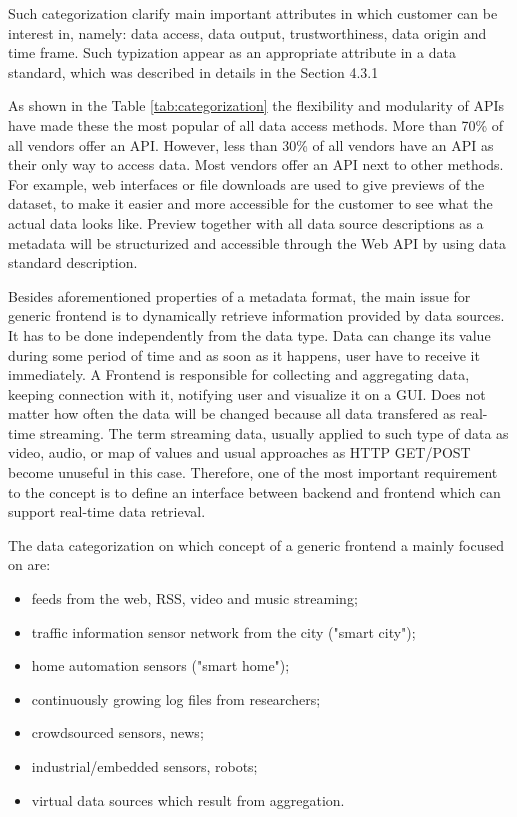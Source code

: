 	Such categorization clarify main important attributes in which customer can be interest in, namely: data access, data output, trustworthiness, data origin and time frame. Such typization appear as an appropriate attribute in a data standard, which was described in details in the Section 4.3.1

	As shown in the Table \ref{tab:categorization} the flexibility and modularity of APIs have made these the most popular of all data access methods. More than 70\% of all vendors offer an API. However, less than 30\% of all vendors have an API as their only way to access data. Most vendors offer an API next to other methods. For example, web interfaces or file downloads are used to give previews of the dataset, to make it easier and more accessible for the customer to see what the actual data looks like. Preview together with all data source descriptions as a metadata will be structurized and accessible through the Web API by using data standard description.

	Besides aforementioned properties of a metadata format, the main issue for generic frontend is to dynamically retrieve information provided by data sources. It has to be done independently from the data type. Data can change its value during some period of time and as soon as it happens, user have to receive it immediately. A Frontend is responsible for collecting and aggregating data, keeping connection with it, notifying user and visualize it on a GUI. Does not matter how often the data will be changed because all data transfered as real-time streaming. The term streaming data, usually applied to such type of data as video, audio, or map of values and usual approaches as HTTP GET/POST become unuseful in this case. Therefore, one of the most important requirement to the concept is to define an interface between backend and frontend which can support real-time data retrieval. 

    The data categorization on which concept of a generic frontend a mainly focused on are:
    \begin{itemize}
    \item feeds from the web, RSS, video and music streaming;
    \item traffic information sensor network from the city ("smart city");
    \item home automation sensors ("smart home");
    \item continuously growing log files from researchers;
    \item crowdsourced sensors, news;
    \item industrial/embedded sensors, robots;
    \item virtual data sources which result from aggregation.
    \end{itemize}


